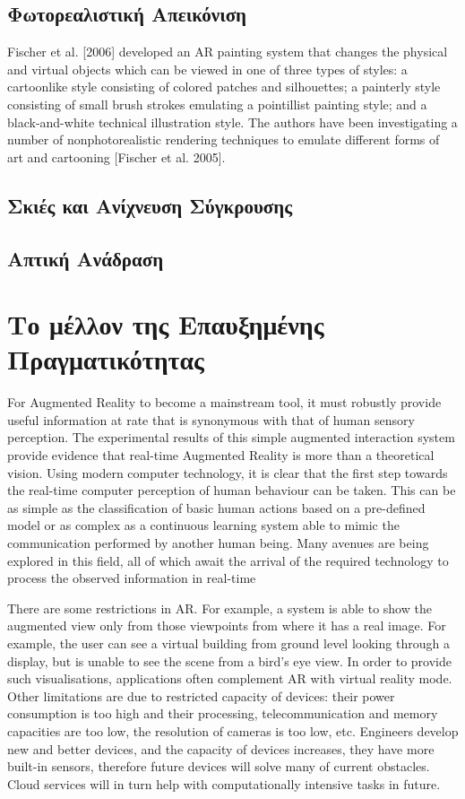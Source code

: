 \subsection{Φωτορεαλιστική Απεικόνιση}

Fischer et al. [2006] developed an AR painting system that changes the physical and virtual objects which can be viewed in one of three types of styles: a cartoonlike style consisting of colored patches and silhouettes; a painterly style consisting of small brush strokes emulating a pointillist painting style; and a black-and-white technical illustration style. The authors have been investigating a number of nonphotorealistic rendering techniques to emulate different forms of art and cartooning [Fischer et al. 2005].
\subsection{Σκιές και Ανίχνευση Σύγκρουσης }
\subsection{Απτική Ανάδραση }

\section{Το μέλλον της Επαυξημένης Πραγματικότητας}

For Augmented Reality to become a mainstream tool, it must robustly provide useful information at rate that is synonymous with that of human sensory perception. The experimental results of this simple augmented interaction system provide evidence that real-time Augmented Reality is more than a theoretical vision. Using modern computer technology, it is clear that the first step towards the real-time computer perception of human behaviour can be taken. This can be as simple as the classification of basic human actions based on a pre-defined model or as complex as a continuous learning system able to mimic the communication performed by another human being. Many avenues are being explored in this field, all of which await the arrival of the required technology to process the observed information in real-time







There are some restrictions in AR. For example, a system is able to show the augmented view only from those viewpoints from where it has a real image. For example, the user can see a virtual building from ground level looking through a display, but is unable to see the scene from a bird's eye view. In order to provide such visualisations, applications often complement AR with virtual reality mode. Other limitations are due to restricted capacity of devices: their power consumption is too high and their processing, telecommunication and memory capacities are too low, the resolution of cameras is too low, etc. Engineers develop new and better devices, and the capacity of devices increases, they have more built-in sensors, therefore future devices will solve many of current obstacles. Cloud services will in turn help with computationally intensive tasks in future.

